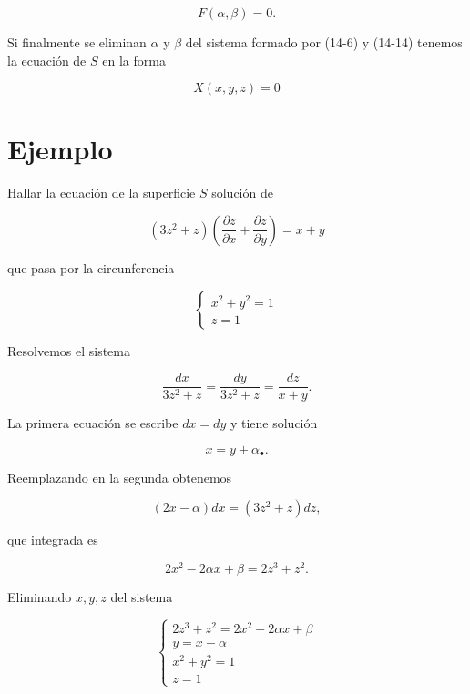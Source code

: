 \documentclass[10pt]{article}
\theoremstyle{plain}
\theoremstyle{definition}
\theoremstyle{remark}
\begin{document}
\begin{equation*}
F(\alpha, \beta)=0 . \tag{14-14}
\end{equation*}


Si finalmente se eliminan $\alpha$ y $\beta$ del sistema formado por (14-6) y (14-14) tenemos la ecuación de $S$ en la forma

$$
X(x, y, z)=0
$$

\section*{Ejemplo}
Hallar la ecuación de la superficie $S$ solución de


\begin{equation*}
\left(3 z^{2}+z\right)\left(\frac{\partial z}{\partial x}+\frac{\partial z}{\partial y}\right)=x+y \tag{14-15}
\end{equation*}


que pasa por la circunferencia

$$
\left\{\begin{array}{l}
x^{2}+y^{2}=1 \\
z=1
\end{array}\right.
$$

Resolvemos el sistema


$$
\frac{d x}{3 z^{2}+z}=\frac{d y}{3 z^{2}+z}=\frac{d z}{x+y} .
$$

La primera ecuación se escribe $d x=d y$ y tiene solución


\begin{equation*}
x=y+\alpha_{\bullet} . \tag{14-16}
\end{equation*}


Reemplazando en la segunda obtenemos

$$
(2 x-\alpha) d x=\left(3 z^{2}+z\right) d z,
$$

que integrada es


\begin{equation*}
2 x^{2}-2 \alpha x+\beta=2 z^{3}+z^{2} . \tag{14-17}
\end{equation*}


Eliminando $x, y, z$ del sistema

$$
\left\{\begin{array}{l}
2 z^{3}+z^{2}=2 x^{2}-2 \alpha x+\beta \\
y=x-\alpha \\
x^{2}+y^{2}=1 \\
z=1
\end{array}\right.
$$
\end{document}
